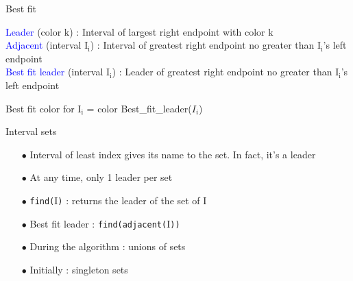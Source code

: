 \begin{frame}{Best fit}
\begin{definition}

\textcolor{blue}{Leader} (color $\mathrm{k}$) : Interval of largest right endpoint with color $\mathrm{k}$\\

\textcolor{blue}{Adjacent} (interval $\mathrm{I_{i}}$) : Interval of greatest right endpoint no greater than $\mathrm{I_{i}}$'s left endpoint\\

\textcolor{blue}{Best fit leader} (interval $\mathrm{I_{i}}$) : Leader of greatest right endpoint no greater than $\mathrm{I_{i}}$'s left endpoint
\end{definition}

Best fit color for $\mathrm{I_{i}}$ = color Best\_fit\_leader($I_{i}$)

\end{frame}

\begin{frame}{Interval sets}
  \begin{itemize}
    \item[$\bullet$]Interval of least index gives its name to the set. In fact, it's a leader
    \item[$\bullet$]At any time, only 1 leader per set
    \item[$\bullet$]\texttt{find($\mathrm{I}$)} : returns the leader of the set of $\mathrm{I}$
    \item[$\bullet$]Best fit leader : \texttt{find(adjacent($\mathrm{I}$))}
\item[$\bullet$]During the algorithm : unions of sets
    \item[$\bullet$]Initially : singleton sets
  \end{itemize}
\end{frame}
